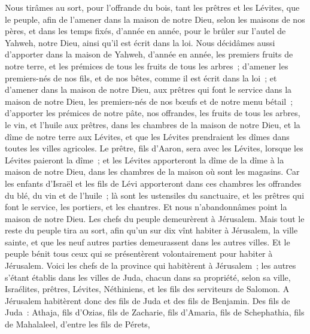 \begin{multicols}{2}
Nous tirâmes au sort, pour l'offrande du bois, tant les prêtres et les Lévites, que le peuple, afin de l'amener dans la maison de notre Dieu, selon les maisons de nos pères, et dans les temps fixés, d'année en année, pour le brûler sur l'autel de Yahweh, notre Dieu, ainsi qu'il est écrit dans la loi.
Nous décidâmes aussi d'apporter dans la maison de Yahweh, d'année en année, les premiers fruits de notre terre, et les prémices de tous les fruits de tous les arbres~;
d'amener les premiers-nés de nos fils, et de nos bêtes, comme il est écrit dans la loi~; et d'amener dans la maison de notre Dieu, aux prêtres qui font le service dans la maison de notre Dieu, les premiers-nés de nos bœufs et de notre menu bétail~;
d'apporter les prémices de notre pâte, nos offrandes, les fruits de tous les arbres, le vin, et l'huile aux prêtres, dans les chambres de la maison de notre Dieu, et la dîme de notre terre aux Lévites, et que les Lévites prendraient les dîmes dans toutes les villes agricoles.
Le prêtre, fils d'Aaron, sera avec les Lévites, lorsque les Lévites paieront la dîme~; et les Lévites apporteront la dîme de la dîme à la maison de notre Dieu, dans les chambres de la maison où sont les magasins.
Car les enfants d'Israël et les fils de Lévi apporteront dans ces chambres les offrandes du blé, du vin et de l'huile~; là sont les ustensiles du sanctuaire, et les prêtres qui font le service, les portiers, et les chantres. Et nous n'abandonnâmes point la maison de notre Dieu.
\VerseOne{}Les chefs du peuple demeurèrent à Jérusalem. Mais tout le reste du peuple tira au sort, afin qu'un sur dix vînt habiter à Jérusalem, la ville sainte, et que les neuf autres parties demeurassent dans les autres villes.
Et le peuple bénit tous ceux qui se présentèrent volontairement pour habiter à Jérusalem.
Voici les chefs de la province qui habitèrent à Jérusalem~; les autres s'étant établis dans les villes de Juda, chacun dans sa propriété, selon sa ville, Israélites, prêtres, Lévites, Néthiniens, et les fils des serviteurs de Salomon.
A Jérusalem habitèrent donc des fils de Juda et des fils de Benjamin. Des fils de Juda~: Athaja, fils d'Ozias, fils de Zacharie, fils d'Amaria, fils de Schephathia, fils de Mahalaleel, d'entre les fils de Pérets,

\end{multicols}
